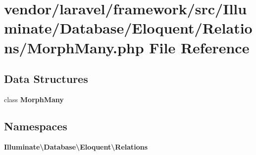 \section{vendor/laravel/framework/src/\+Illuminate/\+Database/\+Eloquent/\+Relations/\+Morph\+Many.php File Reference}
\label{_morph_many_8php}
\subsection*{Data Structures}
\begin{DoxyCompactItemize}
\item 
class {\bf Morph\+Many}
\end{DoxyCompactItemize}
\subsection*{Namespaces}
\begin{DoxyCompactItemize}
\item 
 {\bf Illuminate\textbackslash{}\+Database\textbackslash{}\+Eloquent\textbackslash{}\+Relations}
\end{DoxyCompactItemize}
